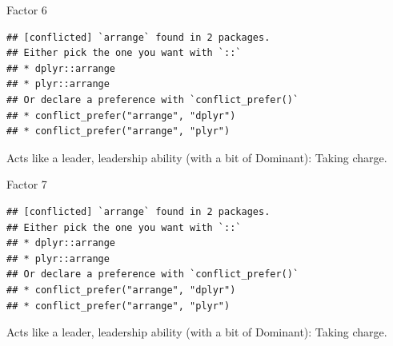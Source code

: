 \documentclass[ignorenonframetext,]{beamer}
\newenvironment{Shaded}{\begin{snugshade}}{\end{snugshade}}
\newcommand{\DecValTok}[1]{\textcolor[rgb]{0.00,0.00,0.81}{#1}}
\newcommand{\KeywordTok}[1]{\textcolor[rgb]{0.13,0.29,0.53}{\textbf{#1}}}
\newcommand{\NormalTok}[1]{#1}
\newcommand{\OperatorTok}[1]{\textcolor[rgb]{0.81,0.36,0.00}{\textbf{#1}}}
\newcommand{\StringTok}[1]{\textcolor[rgb]{0.31,0.60,0.02}{#1}}
\begin{document}
\begin{frame}[fragile]{Factor 6}
\protect\hypertarget{factor-6}{}

\begin{Shaded}
\end{Shaded}

\begin{verbatim}
## [conflicted] `arrange` found in 2 packages.
## Either pick the one you want with `::` 
## * dplyr::arrange
## * plyr::arrange
## Or declare a preference with `conflict_prefer()`
## * conflict_prefer("arrange", "dplyr")
## * conflict_prefer("arrange", "plyr")
\end{verbatim}

Acts like a leader, leadership ability (with a bit of Dominant): Taking
charge.

\end{frame}

\begin{frame}[fragile]{Factor 7}
\protect\hypertarget{factor-7}{}

\begin{Shaded}
\end{Shaded}

\begin{verbatim}
## [conflicted] `arrange` found in 2 packages.
## Either pick the one you want with `::` 
## * dplyr::arrange
## * plyr::arrange
## Or declare a preference with `conflict_prefer()`
## * conflict_prefer("arrange", "dplyr")
## * conflict_prefer("arrange", "plyr")
\end{verbatim}

Acts like a leader, leadership ability (with a bit of Dominant): Taking
charge.

\end{frame}
\end{document}
